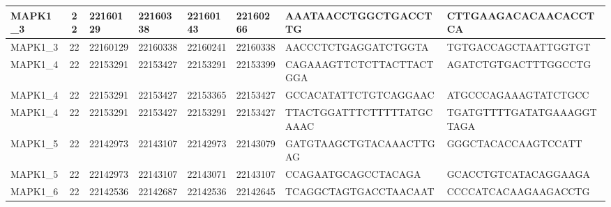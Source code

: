 \begin{landscape}
\begin{longtable}{| p{} | p{} | p{} | p{} | p{} | p{} | p{} | p{} |}
\multicolumn{1}{|l|}{MAPK1\_3}   & \multicolumn{1}{c|}{22} & \multicolumn{1}{l|}{22160129}  & \multicolumn{1}{l|}{22160338}  & \multicolumn{1}{l|}{22160143}  & \multicolumn{1}{l|}{22160266}  & \multicolumn{1}{l|}{AAATAACCTGGCTGACCTTG}            & \multicolumn{1}{l|}{CTTGAAGACACAACACCTCA}          \\ \hline
\multicolumn{1}{|l|}{MAPK1\_3}   & \multicolumn{1}{c|}{22} & \multicolumn{1}{l|}{22160129}  & \multicolumn{1}{l|}{22160338}  & \multicolumn{1}{l|}{22160241}  & \multicolumn{1}{l|}{22160338}  & \multicolumn{1}{l|}{AACCCTCTGAGGATCTGGTA}            & \multicolumn{1}{l|}{TGTGACCAGCTAATTGGTGT}          \\ \hline
\multicolumn{1}{|l|}{MAPK1\_4}   & \multicolumn{1}{c|}{22} & \multicolumn{1}{l|}{22153291}  & \multicolumn{1}{l|}{22153427}  & \multicolumn{1}{l|}{22153291}  & \multicolumn{1}{l|}{22153399}  & \multicolumn{1}{l|}{CAGAAAGTTCTCTTACTTACTGGA}        & \multicolumn{1}{l|}{AGATCTGTGACTTTGGCCTG}          \\ \hline
\multicolumn{1}{|l|}{MAPK1\_4}   & \multicolumn{1}{c|}{22} & \multicolumn{1}{l|}{22153291}  & \multicolumn{1}{l|}{22153427}  & \multicolumn{1}{l|}{22153365}  & \multicolumn{1}{l|}{22153427}  & \multicolumn{1}{l|}{GCCACATATTCTGTCAGGAAC}           & \multicolumn{1}{l|}{ATGCCCAGAAAGTATCTGCC}          \\ \hline
\multicolumn{1}{|l|}{MAPK1\_4}   & \multicolumn{1}{c|}{22} & \multicolumn{1}{l|}{22153291}  & \multicolumn{1}{l|}{22153427}  & \multicolumn{1}{l|}{22153291}  & \multicolumn{1}{l|}{22153427}  & \multicolumn{1}{l|}{TTACTGGATTTCTTTTTATGCAAAC}       & \multicolumn{1}{l|}{TGATGTTTTGATATGAAAGGTTAGA}     \\ \hline
\multicolumn{1}{|l|}{MAPK1\_5}   & \multicolumn{1}{c|}{22} & \multicolumn{1}{l|}{22142973}  & \multicolumn{1}{l|}{22143107}  & \multicolumn{1}{l|}{22142973}  & \multicolumn{1}{l|}{22143079}  & \multicolumn{1}{l|}{GATGTAAGCTGTACAAACTTGAG}         & \multicolumn{1}{l|}{GGGCTACACCAAGTCCATT}           \\ \hline
\multicolumn{1}{|l|}{MAPK1\_5}   & \multicolumn{1}{c|}{22} & \multicolumn{1}{l|}{22142973}  & \multicolumn{1}{l|}{22143107}  & \multicolumn{1}{l|}{22143071}  & \multicolumn{1}{l|}{22143107}  & \multicolumn{1}{l|}{CCAGAATGCAGCCTACAGA}             & \multicolumn{1}{l|}{GCACCTGTCATACAGGAAGA}          \\ \hline
\multicolumn{1}{|l|}{MAPK1\_6}   & \multicolumn{1}{c|}{22} & \multicolumn{1}{l|}{22142536}  & \multicolumn{1}{l|}{22142687}  & \multicolumn{1}{l|}{22142536}  & \multicolumn{1}{l|}{22142645}  & \multicolumn{1}{l|}{TCAGGCTAGTGACCTAACAAT}           & \multicolumn{1}{l|}{CCCCATCACAAGAAGACCTG}          \\ \hline

\end{longtable}
\end{landscape}
